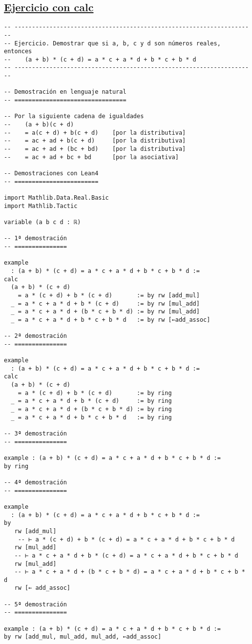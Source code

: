 \subsection{\href{./src/Basicos/Ejercicio\_con\_calc.lean}{Ejercicio con calc}}
\label{sec:orgbc5416c}
\begin{verbatim}
-- ---------------------------------------------------------------------
-- Ejercicio. Demostrar que si a, b, c y d son números reales, entonces
--    (a + b) * (c + d) = a * c + a * d + b * c + b * d
-- ---------------------------------------------------------------------

-- Demostración en lenguaje natural
-- ================================

-- Por la siguiente cadena de igualdades
--    (a + b)(c + d)
--    = a(c + d) + b(c + d)    [por la distributiva]
--    = ac + ad + b(c + d)     [por la distributiva]
--    = ac + ad + (bc + bd)    [por la distributiva]
--    = ac + ad + bc + bd      [por la asociativa]

-- Demostraciones con Lean4
-- ========================

import Mathlib.Data.Real.Basic
import Mathlib.Tactic

variable (a b c d : ℝ)

-- 1ª demostración
-- ===============

example
  : (a + b) * (c + d) = a * c + a * d + b * c + b * d :=
calc
  (a + b) * (c + d)
    = a * (c + d) + b * (c + d)       := by rw [add_mul]
  _ = a * c + a * d + b * (c + d)     := by rw [mul_add]
  _ = a * c + a * d + (b * c + b * d) := by rw [mul_add]
  _ = a * c + a * d + b * c + b * d   := by rw [←add_assoc]

-- 2ª demostración
-- ===============

example
  : (a + b) * (c + d) = a * c + a * d + b * c + b * d :=
calc
  (a + b) * (c + d)
    = a * (c + d) + b * (c + d)       := by ring
  _ = a * c + a * d + b * (c + d)     := by ring
  _ = a * c + a * d + (b * c + b * d) := by ring
  _ = a * c + a * d + b * c + b * d   := by ring

-- 3ª demostración
-- ===============

example : (a + b) * (c + d) = a * c + a * d + b * c + b * d :=
by ring

-- 4ª demostración
-- ===============

example
  : (a + b) * (c + d) = a * c + a * d + b * c + b * d :=
by
   rw [add_mul]
    -- ⊢ a * (c + d) + b * (c + d) = a * c + a * d + b * c + b * d
   rw [mul_add]
   -- ⊢ a * c + a * d + b * (c + d) = a * c + a * d + b * c + b * d
   rw [mul_add]
   -- ⊢ a * c + a * d + (b * c + b * d) = a * c + a * d + b * c + b * d
   rw [← add_assoc]

-- 5ª demostración
-- ===============

example : (a + b) * (c + d) = a * c + a * d + b * c + b * d :=
by rw [add_mul, mul_add, mul_add, ←add_assoc]
\end{verbatim}

